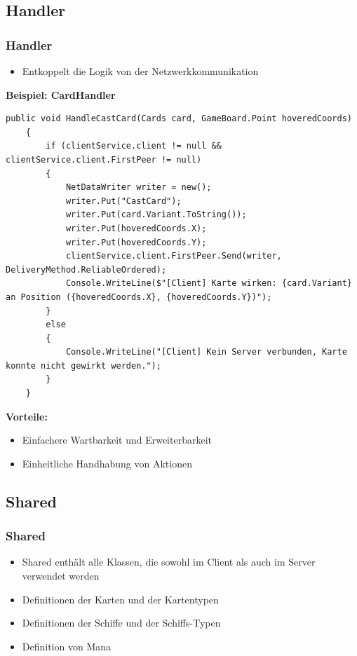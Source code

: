 \documentclass{beamer}
\begin{document}
\subsection{Handler}
\begin{frame}[fragile]
\frametitle{Handler}
  \begin{itemize}
    \item Entkoppelt die Logik von der Netzwerkkommunikation
  \end{itemize}
  \textbf{Beispiel: CardHandler}
  \begin{lstlisting}[language=CSharp, basicstyle=\ttfamily\tiny, breaklines=true]
    public void HandleCastCard(Cards card, GameBoard.Point hoveredCoords)
    {
        if (clientService.client != null && clientService.client.FirstPeer != null)
        {
            NetDataWriter writer = new();
            writer.Put("CastCard");
            writer.Put(card.Variant.ToString());
            writer.Put(hoveredCoords.X);
            writer.Put(hoveredCoords.Y);
            clientService.client.FirstPeer.Send(writer, DeliveryMethod.ReliableOrdered);
            Console.WriteLine($"[Client] Karte wirken: {card.Variant} an Position ({hoveredCoords.X}, {hoveredCoords.Y})");
        }
        else
        {
            Console.WriteLine("[Client] Kein Server verbunden, Karte konnte nicht gewirkt werden.");
        }
    }
  \end{lstlisting}
  \textbf{Vorteile:}
  \begin{itemize}
    \item Einfachere Wartbarkeit und Erweiterbarkeit
    \item Einheitliche Handhabung von Aktionen
  \end{itemize} 
\end{frame}

\subsection{Shared}
\begin{frame}
\frametitle{Shared}
  \begin{itemize}
    \item Shared enthält alle Klassen, die sowohl im Client als auch im Server verwendet werden
    \item Definitionen der Karten und der Kartentypen
    \item Definitionen der Schiffe und der Schiffs-Typen
    \item Definition von Mana
  \end{itemize}
\end{frame}
\end{document}
